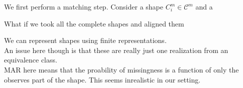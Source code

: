 \documentclass{article}\usepackage[]{graphicx}\usepackage[]{color}
\begin{document}
We first perform a matching step.
Consider a shape $C_{i}^m \in \mathcal{C}^m$ and a 










What if we took all the complete shapes and aligned them 



We can represent shapes using finite representations.\\
An issue here though is that these are really just one realization from an equivalence class.   \\
MAR here means that the proability of missingness is a function of only the observes part of the shape. This seems inrealistic in our setting.  

%
%
\end{document}
